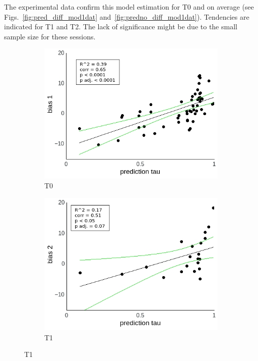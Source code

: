 \documentclass[a4paper]{scrreprt}
\begin{document}
The experimental data confirm this model estimation for T0 and on average (see Figs.~\ref{fig:pred_diff_mod1dat} and~\ref{fig:predno_diff_mod1dat}). Tendencies are indicated for T1 and T2. The lack of significance might be due to the small sample size for these sessions.


\begin{figure}
\centering
\begin{subfigure}[b]{0.49\textwidth}
        \includegraphics[width=\textwidth]{figs/sec3/pred/pred_diff_1_mod1dat.jpeg}
        \caption{T0}
    \end{subfigure}
    \begin{subfigure}[b]{0.49\textwidth}
        \includegraphics[width=\textwidth]{figs/sec3/pred/pred_diff_2_mod1dat.jpeg}
        \caption{T1}
    \end{subfigure}


\end{figure}
\end{document}
